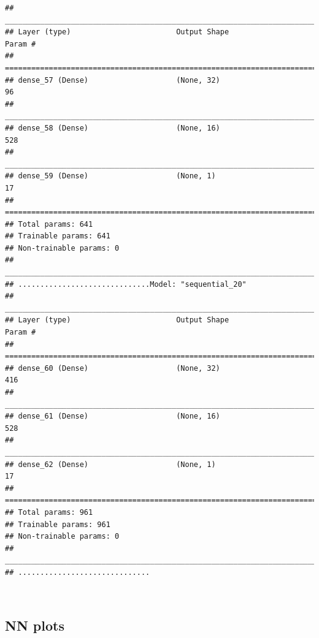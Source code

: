 \documentclass[
]{article}
\newenvironment{Shaded}{\begin{snugshade}}{\end{snugshade}}
\newcommand{\NormalTok}[1]{#1}
\newcommand{\OperatorTok}[1]{\textcolor[rgb]{0.81,0.36,0.00}{\textbf{#1}}}
\newcommand{\StringTok}[1]{\textcolor[rgb]{0.31,0.60,0.02}{#1}}
\begin{document}
\begin{verbatim}
## ________________________________________________________________________________
## Layer (type)                        Output Shape                    Param #     
## ================================================================================
## dense_57 (Dense)                    (None, 32)                      96          
## ________________________________________________________________________________
## dense_58 (Dense)                    (None, 16)                      528         
## ________________________________________________________________________________
## dense_59 (Dense)                    (None, 1)                       17          
## ================================================================================
## Total params: 641
## Trainable params: 641
## Non-trainable params: 0
## ________________________________________________________________________________
## ..............................Model: "sequential_20"
## ________________________________________________________________________________
## Layer (type)                        Output Shape                    Param #     
## ================================================================================
## dense_60 (Dense)                    (None, 32)                      416         
## ________________________________________________________________________________
## dense_61 (Dense)                    (None, 16)                      528         
## ________________________________________________________________________________
## dense_62 (Dense)                    (None, 1)                       17          
## ================================================================================
## Total params: 961
## Trainable params: 961
## Non-trainable params: 0
## ________________________________________________________________________________
## ..............................
\end{verbatim}

\begin{Shaded}
\end{Shaded}

~\\

\hypertarget{nn-plots}{%
\subsection{NN plots}\label{nn-plots}}
\end{document}
